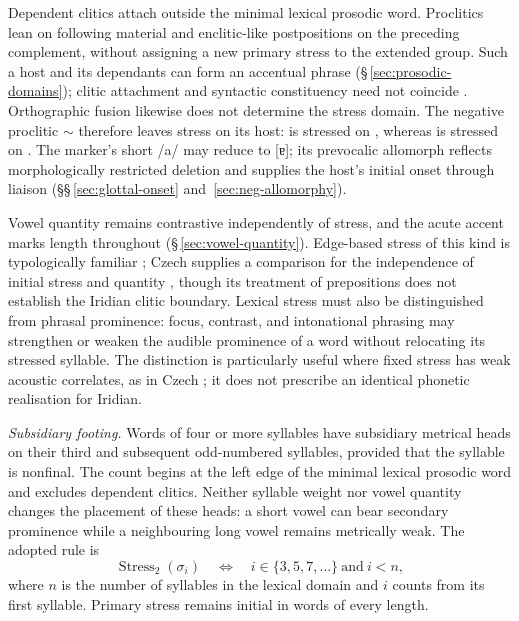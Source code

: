Dependent clitics attach outside the minimal lexical prosodic word. Proclitics
lean on following material and enclitic-like postpositions on the preceding
complement, without assigning a new primary stress to the extended group.
Such a host and its dependants can form an accentual phrase
(§\,\ref{sec:prosodic-domains}); clitic attachment and syntactic constituency
need not coincide \cite{booij1996}. Orthographic fusion likewise does not
determine the stress domain. The negative proclitic  $\sim$ 
therefore leaves stress on its host:  is stressed on
, whereas  is stressed on .
The marker's short /a/ may reduce to [ɐ]; its prevocalic allomorph
 reflects morphologically restricted deletion and supplies the
host's initial onset through liaison
(§§\,\ref{sec:glottal-onset} and~\ref{sec:neg-allomorphy}).

Vowel quantity remains contrastive independently of stress, and the acute accent
marks length throughout (§\,\ref{sec:vowel-quantity}). Edge-based stress of this
kind is typologically familiar \cite{goedemansvanderhulst2013}; Czech supplies
a comparison for the independence of initial stress and quantity
\cite{simackova2012}, though its treatment of prepositions does not
establish the Iridian clitic boundary. Lexical stress must also be distinguished
from phrasal prominence: focus, contrast, and intonational phrasing may strengthen
or weaken the audible prominence of a word without relocating its stressed
syllable. The distinction is particularly useful where fixed stress has weak
acoustic correlates, as in Czech \cite{skarnitzleriksson2017}; it does not
prescribe an identical phonetic realisation for Iridian.

\noindent\textit{Subsidiary footing.}\quad
Words of four or more syllables have subsidiary metrical heads on their
third and subsequent odd-numbered syllables, provided that the syllable is
nonfinal. The count begins at the left edge of the minimal lexical
prosodic word and excludes dependent clitics. Neither syllable weight nor
vowel quantity changes the placement of these heads: a short vowel can bear
secondary prominence while a neighbouring long vowel remains metrically
weak. The adopted rule is
\[
  \operatorname{Stress}_{2}(\sigma_i)
  \quad\Longleftrightarrow\quad
  i\in\{3,5,7,\ldots\}\ \text{and}\ i<n,
\]
where $n$ is the number of syllables in the lexical domain and $i$ counts
from its first syllable. Primary stress remains initial in words of every
length.

